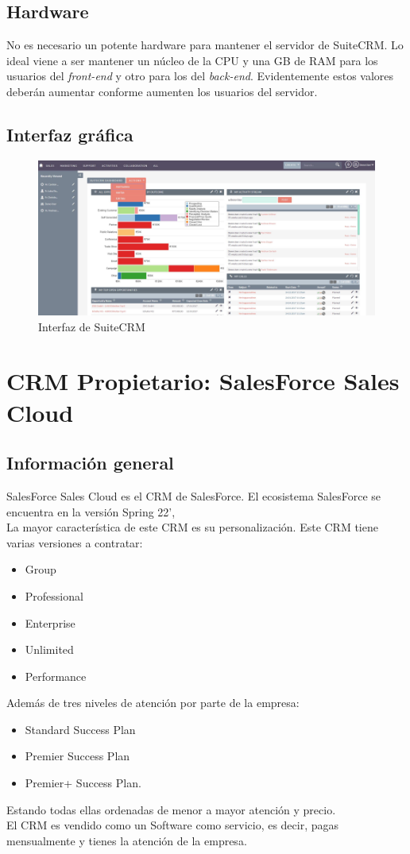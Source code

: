 \documentclass[openany,overnay,a4paper, twoside, 12pt]{book}
\begin{document}
\subsection{Hardware}
No es necesario un potente hardware para mantener el servidor de SuiteCRM. Lo ideal viene a ser mantener un núcleo de la CPU y una GB de RAM para los usuarios del \textit{front-end} y otro para los del \textit{back-end}. Evidentemente estos valores deberán aumentar conforme aumenten los usuarios del servidor.
\subsection{Interfaz gráfica}
\begin{figure}[h]
    \centering
    \includegraphics[scale=0.25]{sgeI/suiteCRM.jpg}
    \caption{Interfaz de SuiteCRM}
    \label{fig:my_label}
\end{figure}
\newpage
\section{CRM Propietario: SalesForce Sales Cloud}
\subsection{Información general}
SalesForce Sales Cloud es el CRM de SalesForce. El ecosistema SalesForce se encuentra en la versión Spring 22', \\ La mayor característica de este CRM es su personalización. Este CRM tiene varias versiones a contratar: 
\begin{itemize}
    \item Group
    \item Professional
    \item Enterprise
    \item Unlimited
    \item Performance
\end{itemize}
Además de tres niveles de atención por parte de la empresa: 
\begin{itemize}
    \item Standard Success Plan
    \item Premier Success Plan
    \item Premier+ Success Plan.
\end{itemize}
Estando todas ellas ordenadas de menor a mayor atención y precio.\\El CRM es vendido como un Software como servicio, es decir, pagas mensualmente y tienes la atención de la empresa. 
\end{document}
